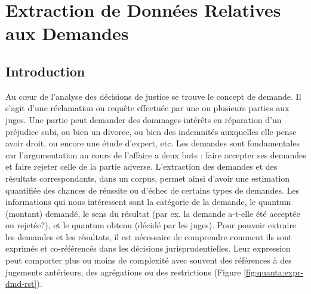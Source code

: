 \chapter{Extraction de Données Relatives aux Demandes}
\label{chap:quanta}

\section{Introduction}
\label{sec:quanta:introduction}
Au c\oe{}ur de l'analyse des décisions de justice se trouve le concept de demande. Il s'agit d'une réclamation ou requête effectuée par une ou plusieurs parties aux juges. Une partie peut demander des dommages-intérêts en réparation d'un préjudice subi, ou bien un divorce, ou bien des indemnités auxquelles elle pense avoir droit, ou encore une étude d'expert, etc. Les demandes sont fondamentales car l'argumentation au cours de l'affaire a deux buts : faire accepter ses demandes et faire rejeter celle de la partie adverse. L'extraction des demandes et des résultats correspondants, dans un corpus, permet ainsi d'avoir une estimation quantifiée des chances de réussite ou d'échec de certains types de demandes. Les informations qui nous intéressent sont la catégorie de la demande, le quantum (montant) demandé, le sens du résultat (par ex. la demande a-t-elle été acceptée ou rejetée?), et le quantum obtenu (décidé par les juges). Pour pouvoir extraire les demandes et les résultats, il est nécessaire de comprendre comment ils sont exprimés et co-référencés dans les décisions jurisprudentielles. Leur expression peut comporter plus ou moins de complexité avec souvent des références à des jugements antérieurs, des agrégations ou des restrictions (Figure \ref{fig:quanta:expr-dmd-rst}).

